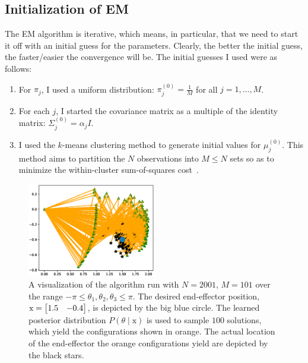 \subsection{Initialization of EM}
\label{ssec:initialization}
%
The EM algorithm is iterative, which means, in particular, that we need to start
it off with an initial guess for the parameters. Clearly, the better the initial
guess, the faster/easier the convergence will be. The initial guesses I used
were as follows:
%
\begin{enumerate}
    \setlength\itemsep{0.0em}
    \item For $\pi_j$, I used a uniform distribution: $\pi_j^{(0)} =
    \frac{1}{M}$ for all $j = 1, \ldots, M$.
    \item For each $j$, I started the covariance matrix as a multiple of the
    identity matrix: $\Sigma_j^{(0)} = \alpha_j I$.
    \item I used the $k$-means clustering method to generate initial values for
    $\mu_j^{(0)}$. This method aims to partition the $N$ observations into $M
    \leq N$ sets so as to minimize the within-cluster sum-of-squares
    cost~\cite{wiki:K-means_clustering}.
\end{enumerate}
%
\begin{figure}
    \vspace{-20mm}
	\centering
	\includegraphics[width=0.5\textwidth]{./figures/GMM_sample_solution.eps}
	\caption{A visualization of the algorithm run with $N=2001$, $M=101$ over
    the range $-\pi \leq \theta_1, \theta_2, \theta_3 \leq \pi$. The desired end-effector position, $\mathrm{x} = \begin{bmatrix}1.5 &
    -0.4\end{bmatrix}$, is depicted by the big blue circle. The learned posterior
    distribution $P(\theta \mid \mathrm{x})$ is used to sample $100$ solutions,
    which yield the configurations shown in orange. The actual location of the
    end-effector the orange configurations yield are depicted by the black
    stars.}
    \label{fig:example_sol}
    \vspace{-30mm}
\end{figure}
%

